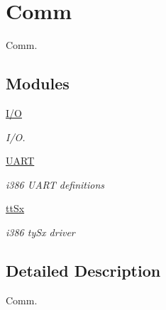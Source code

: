 \hypertarget{group__i386__comm}{}\section{Comm}
\label{group__i386__comm}


Comm.  


\subsection*{Modules}
\begin{DoxyCompactItemize}
\item 
\mbox{\hyperlink{group__i386__io}{I/O}}
\begin{DoxyCompactList}\small\item\em I/O. \end{DoxyCompactList}\item 
\mbox{\hyperlink{group__i386__uart}{U\+A\+RT}}
\begin{DoxyCompactList}\small\item\em i386 U\+A\+RT definitions \end{DoxyCompactList}\item 
\mbox{\hyperlink{group__i386__tty}{tt\+Sx}}
\begin{DoxyCompactList}\small\item\em i386 ty\+Sx driver \end{DoxyCompactList}\end{DoxyCompactItemize}


\subsection{Detailed Description}
Comm. 

